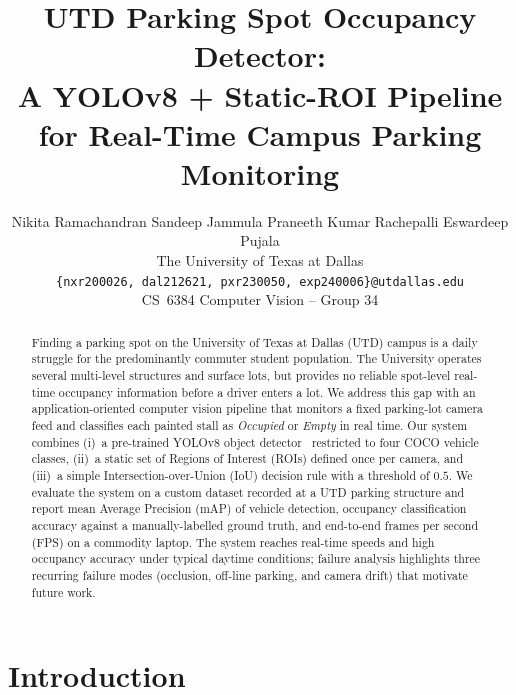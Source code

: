 \documentclass[10pt,twocolumn,letterpaper]{article}
\begin{document}
\title{UTD Parking Spot Occupancy Detector:\\
A YOLOv8 + Static-ROI Pipeline for Real-Time Campus Parking Monitoring}

\author{Nikita Ramachandran \quad Sandeep Jammula \quad
        Praneeth Kumar Rachepalli \quad Eswardeep Pujala\\
The University of Texas at Dallas\\
{\tt\small \{nxr200026, dal212621, pxr230050, exp240006\}@utdallas.edu}\\
CS~6384 Computer Vision -- Group 34}

\maketitle

\begin{abstract}
Finding a parking spot on the University of Texas at Dallas (UTD) campus is a
daily struggle for the predominantly commuter student population. The
University operates several multi-level structures and surface lots, but
provides no reliable spot-level real-time occupancy information before a
driver enters a lot. We address this gap with an application-oriented
computer vision pipeline that monitors a fixed parking-lot camera feed and
classifies each painted stall as \emph{Occupied} or \emph{Empty} in real
time. Our system combines (i)~a pre-trained YOLOv8 object
detector~\cite{redmon2016yolo,jocher2023yolov8} restricted to four COCO
vehicle classes, (ii)~a static set of Regions of Interest (ROIs) defined
once per camera, and (iii)~a simple Intersection-over-Union (IoU) decision
rule with a threshold of $0.5$. We evaluate the system on a custom dataset
recorded at a UTD parking structure and report mean Average Precision (mAP)
of vehicle detection, occupancy classification accuracy against a
manually-labelled ground truth, and end-to-end frames per second (FPS) on a
commodity laptop. The system reaches real-time speeds and high occupancy
accuracy under typical daytime conditions; failure analysis highlights three
recurring failure modes (occlusion, off-line parking, and camera drift) that
motivate future work.
\end{abstract}

\section{Introduction}
\label{sec:intro}
\end{document}
